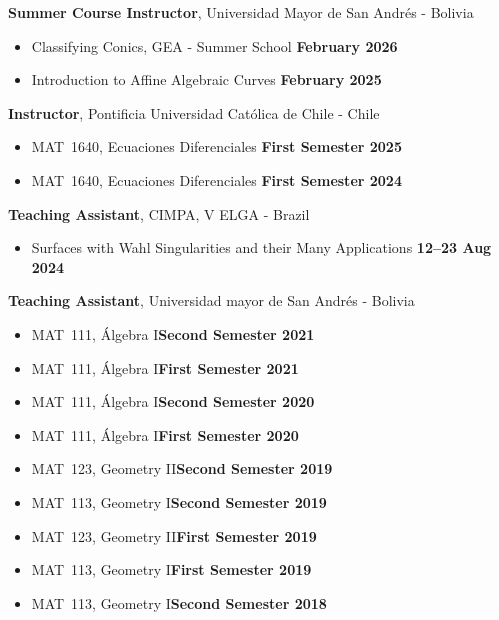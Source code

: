 \documentclass[margin,line]{res}
\begin{document}
\begin{resume}
{\bf Summer Course Instructor}, Universidad Mayor de San Andrés - Bolivia
\vspace*{.05in}
\begin{itemize}
\item[ ] Classifying Conics, GEA - Summer School \hfill {\bf February 2026}
\item[ ] Introduction to Affine Algebraic Curves \hfill {\bf February 2025}
\end{itemize}

{\bf Instructor}, Pontificia Universidad Católica de Chile - Chile
\vspace*{.05in}
\begin{itemize}
\item[ ] MAT~1640, Ecuaciones Diferenciales \hfill {\bf First Semester 2025}
\item[ ] MAT~1640, Ecuaciones Diferenciales \hfill {\bf First Semester 2024}
\end{itemize}

{\bf Teaching Assistant}, CIMPA, V ELGA - Brazil
\vspace*{.05in}
\begin{itemize}
\item[ ] Surfaces with Wahl Singularities and their Many Applications \hfill {\bf 
 12--23 Aug 2024}
\end{itemize}
{\bf Teaching Assistant}, Universidad mayor de San Andrés - Bolivia
\vspace*{.05in}
\begin{itemize}
\item[ ] MAT~111, Álgebra I\hfill {\bf Second Semester 2021}
\item[ ] MAT~111, Álgebra I\hfill {\bf First Semester 2021}
\item[ ] MAT~111, Álgebra I\hfill {\bf Second Semester 2020}
\item[ ] MAT~111, Álgebra I\hfill {\bf First Semester 2020}
\item[ ] MAT~123, Geometry II\hfill {\bf Second Semester 2019}
\item[ ] MAT~113, Geometry I\hfill {\bf Second Semester 2019}
\item[ ] MAT~123, Geometry II\hfill {\bf First Semester 2019}
\item[ ] MAT~113, Geometry I\hfill {\bf First Semester 2019}
\item[ ] MAT~113, Geometry I\hfill {\bf Second Semester 2018}
\end{itemize}


\end{resume}
\end{document}
